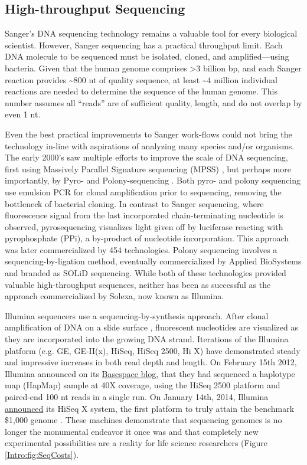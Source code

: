   \subsection{High-throughput Sequencing}
    \label{Intro:subsec: History of HTS}

    Sanger's DNA sequencing technology remains a valuable tool for every biological scientist. However, Sanger sequencing has a practical throughput limit. Each DNA molecule to be sequenced must be isolated, cloned, and amplified---using bacteria. Given that the human genome \citep{Hattori2005a} comprises >3 billion bp, and each Sanger reaction provides \textasciitilde800 nt of quality sequence, at least \textasciitilde4 million individual reactions are needed to determine the sequence of the human genome. This number assumes all ``reads'' are of sufficient quality, length, and do not overlap by even 1 nt.

    Even the best practical improvements to Sanger work-flows could not bring the technology in-line with aspirations of analyzing many species and/or organisms. The early 2000's saw multiple efforts to improve the scale of DNA sequencing, first using Massively Parallel Signature sequencing (MPSS) \citep{Brenner2000a}, but perhaps more importantly, by Pyro- \citep{Ronaghi1998a} and Polony-sequencing \citep{Shendure2005}. Both pyro- and polony sequencing use emulsion PCR \citep{Nakano2003a} for clonal amplification prior to sequencing, removing the bottleneck of bacterial cloning. In contrast to Sanger sequencing, where fluorescence signal from the last incorporated chain-terminating nucleotide is observed, pyrosequencing visualizes light given off by luciferase reacting with pyrophosphate (PPi), a by-product of nucleotide incorporation. This approach was later commercialized by 454 technologies. Polony sequencing involves a sequencing-by-ligation method, eventually commercialized by Applied BioSystems and branded as SOLiD sequencing.
    While both of these technologies provided valuable high-throughput sequences, neither has been as successful as the approach commercialized by Solexa, now known as Illumina.

    Illumina sequencers use a sequencing-by-synthesis approach. After clonal amplification of DNA on a slide surface \citep{Bentley2008}, fluorescent nucleotides are visualized as they are incorporated into the growing DNA strand. Iterations of the Illumina platform (e.g. GE, GE-II(x), HiSeq, HiSeq 2500, Hi X) have demonstrated steady and impressive increases in both read depth and length. On February 15th 2012, Illumina announced on its \href{http://blog.basespace.illumina.com/}{Basespace blog}, that they had sequenced a haplotype map (HapMap) sample at 40X coverage, using the HiSeq 2500 platform and paired-end 100 nt reads in a single run. On January 14th, 2014, Illumina \href{http://bit.ly/PZpegZ}{announced} its HiSeq X system, the first platform to truly attain the benchmark \$1,000 genome \citep{Service2006,Hayden2014}. These machines demonstrate that sequencing genomes is no longer the monumental endeavor it once was and that completely new experimental possibilities are a reality for life science researchers (Figure \ref{Intro:fig:SeqCosts}).

